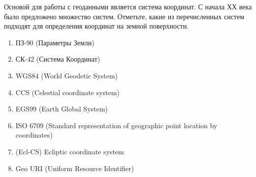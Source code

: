 
Основой для работы с геоданными является система координат. С начала ХХ века было предложено множество систем. Отметьте, какие из перечисленных систем подходят для определения координат на земной поверхности.


\begin{enumerate}
    \item ПЗ-90 (Параметры Земли)
    \item СК-42 (Система Координат)
    \item WGS84 (World Geodetic System)
    \item CCS (Celestial coordinate system)
    \item EGS99 (Earth Global System)
    \item ISO 6709 (Standard representation of geographic point location by coordinates)
    \item (Ecl-CS) Ecliptic coordinate system
    \item Geo URI (Uniform Resource Identifier)
\end{enumerate}